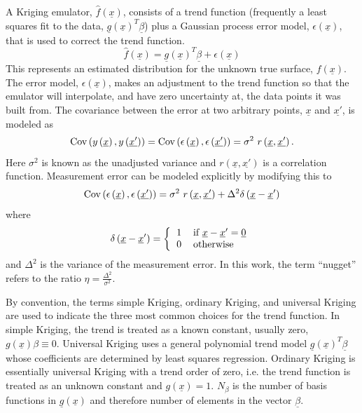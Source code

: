 A Kriging emulator, 
$\hat{f}\left(\underline{x}\right)$, consists of a trend function 
(frequently a least squares fit to the data,
$\underline{g}\left(\underline{x}\right)^T\underline{\beta}$) plus a 
Gaussian process error model, $\epsilon\left(\underline{x}\right)$, 
that is used to correct the trend function.
\begin{displaymath}
\hat{f}\left(\underline{x}\right)=\underline{g}\left(\underline{x}\right)^T\underline{\beta}+\epsilon\left(\underline{x}\right)
\end{displaymath}
This represents an estimated distribution for the unknown true surface,
$f\left(\underline{x}\right)$.  The error model, 
$\epsilon\left(\underline{x}\right)$, makes an adjustment to the
trend function so that the emulator will interpolate, and have zero
uncertainty at, the data points it was built from.   The covariance 
between the error at two arbitrary points, $\underline{x}$
and $\underline{x'}$, is modeled as 
\begin{displaymath}
{\rm Cov}\left(y\left(\underline{x}\right),y\left(\underline{x'}\right)\right)={\rm Cov}\left(\epsilon\left(\underline{x}\right),\epsilon\left(\underline{x'}\right)\right)=\sigma^2\ r\left(\underline{x},\underline{x'}\right).
\end{displaymath}
Here $\sigma^2$ is known as the unadjusted variance and 
$r\left(\underline{x},\underline{x'}\right)$ is a correlation function. 
Measurement error can be modeled explicitly by modifying this to
\begin{displaymath}
{\rm Cov}\left(\epsilon\left(\underline{x}\right),\epsilon\left(\underline{x'}\right)\right)=\sigma^2\ r\left(\underline{x},\underline{x'}\right)+\Delta^2\delta\left(\underline{x}-\underline{x}'\right)
\end{displaymath}
where 
\begin{displaymath}
\delta\left(\underline{x}-\underline{x}'\right)=\left\{\begin{tabular}{ll} 1 & if $\underline{x}-\underline{x}'=\underline{0}$ \\ 0 & otherwise \end{tabular} \right.
\end{displaymath}
and $\Delta^2$ is the variance of the measurement error.  In this work, 
the term ``nugget'' refers to the ratio 
$\eta=\frac{\Delta^2}{\sigma^2}$.\newline

By convention, the terms simple Kriging, ordinary Kriging, and universal 
Kriging are used to indicate the three most common choices for the trend
function.  In simple Kriging, the trend is treated as a known constant, 
usually zero, $g\left(\underline{x}\right)\beta\equiv 0$.  Universal 
Kriging \cite{Mat71} uses a general polynomial trend model 
$\underline{g}\left(\underline{x}\right)^T\underline{\beta}$ whose 
coefficients are determined by least squares regression. Ordinary Kriging
is essentially universal Kriging with a trend order of zero, i.e. the 
trend function is treated as an unknown constant and 
$g\left(\underline{x}\right)=1$. $N_{\beta}$ is the number of basis
functions in $\underline{g}\left(\underline{x}\right)$ and therefore
number of elements in the vector $\underline{\beta}$.\newline

